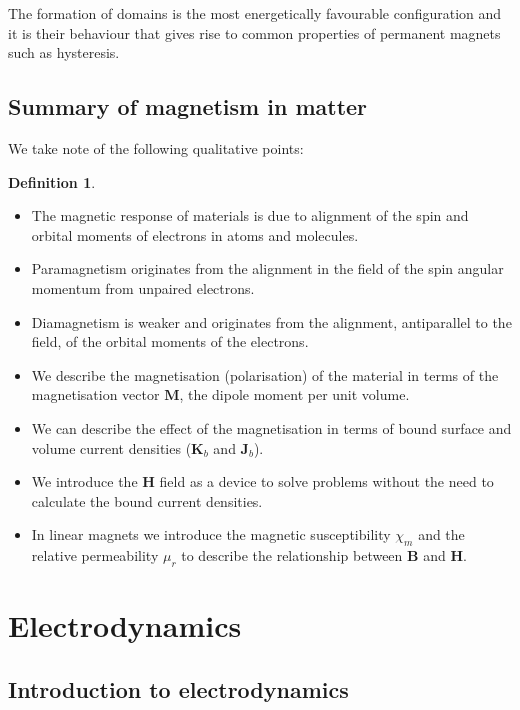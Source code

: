 \documentclass[12pt,chapterprefix=false,dvipsnames]{scrbook}
\theoremstyle{dotless}
\theoremstyle{definition}
\newtheorem{protodefinition}{Definition}[section]
\newenvironment{definition}
{\colorlet{shadecolor}{black!15}\begin{shaded}\begin{protodefinition}}
			{\end{protodefinition}\end{shaded}}
\begin{document}
The formation of domains is the most energetically favourable
configuration and it is their behaviour that gives rise to
common properties of permanent magnets such as hysteresis.

\section{Summary of magnetism in matter}%
\label{sec:summary_of_magnetism_in_matter}

We take note of the following qualitative points:

\begin{definition}
	\begin{itemize}
		Magnetism in matter concerns the following:
		\item The magnetic response of materials is due to alignment of the
		      spin and orbital moments of electrons in atoms and molecules.
		\item Paramagnetism originates from the alignment in the field of the
		      spin angular momentum from unpaired electrons.
		\item Diamagnetism is weaker and originates from the alignment,
		      antiparallel to the field, of the orbital moments of the
		      electrons.
		\item We describe the magnetisation (polarisation) of the material in
		      terms of the magnetisation vector $\bm{M}$, the
		      dipole moment per unit volume.
		\item We can describe the effect of the magnetisation in terms of
		      bound surface and volume current densities
		      ($\bm{K}_b$ and $\bm{J}_b$).
		\item We introduce the $\bm{H}$ field as a device to
		      solve problems without the need to calculate the bound current
		      densities.
		\item In linear magnets we introduce the magnetic susceptibility
		      $\chi_m$ and the relative permeability
		      $\mu_r$ to describe the relationship between
		      $\bm{B}$ and $\bm{H}$.
	\end{itemize}
\end{definition}

\chapter{Electrodynamics}%
\label{cha:electrodynamics}

\section{Introduction to electrodynamics}%
\label{sec:introduction_to_electrodynamics}
\end{document}
